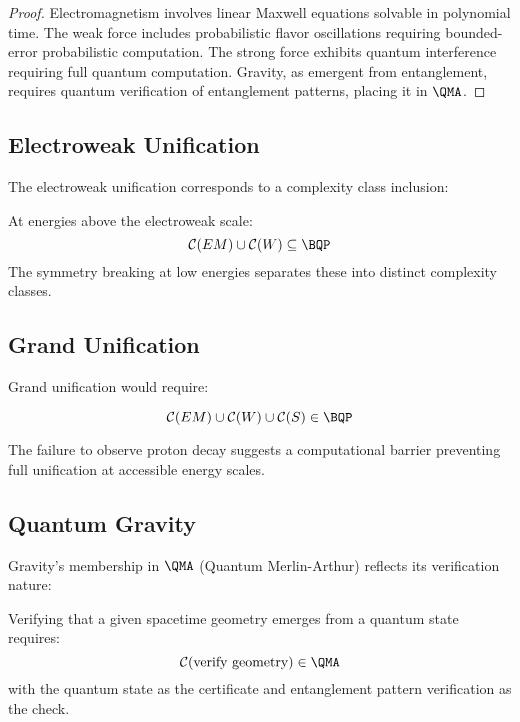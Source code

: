 \documentclass[12pt,a4paper]{article}
\newcommand{\comp}[1]{\mathcal{C}(#1)}
\begin{document}
\begin{proof}
Electromagnetism involves linear Maxwell equations solvable in polynomial time. The weak force includes probabilistic flavor oscillations requiring bounded-error probabilistic computation. The strong force exhibits quantum interference requiring full quantum computation. Gravity, as emergent from entanglement, requires quantum verification of entanglement patterns, placing it in $\QMA$.
\end{proof}

\subsection{Electroweak Unification}

The electroweak unification corresponds to a complexity class inclusion:

\begin{proposition}
At energies above the electroweak scale:
\begin{equation}
\comp{EM} \cup \comp{W} \subseteq \BQP
\end{equation}
The symmetry breaking at low energies separates these into distinct complexity classes.
\end{proposition}

\subsection{Grand Unification}

Grand unification would require:

\begin{equation}
\comp{EM} \cup \comp{W} \cup \comp{S} \in \BQP
\end{equation}

The failure to observe proton decay suggests a computational barrier preventing full unification at accessible energy scales.

\subsection{Quantum Gravity}

Gravity's membership in $\QMA$ (Quantum Merlin-Arthur) reflects its verification nature:

\begin{theorem}
Verifying that a given spacetime geometry emerges from a quantum state requires:
\begin{equation}
\comp{\text{verify geometry}} \in \QMA
\end{equation}
with the quantum state as the certificate and entanglement pattern verification as the check.
\end{theorem}
\end{document}
